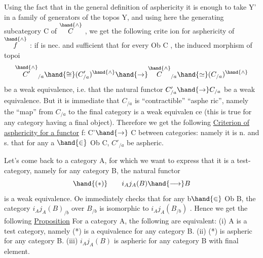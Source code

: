 Using the fact that in the  general definition of asphericity
it is enough to take Y' in a family of generators of the topos Y,  and 
using here the generating subcategory C of $\overset{\hand{\wedge}}{C}$ ,  we get the following crite
ion for asphericity of $\overset{\hand{\wedge}}{f}$ :  if is nec. and sufficient that for every
Ob C ,  the induced morphism of topoi
\[ \overset{\hand{\wedge}}{C'}_{/a} \hand{\cong} (C'_{/a})^{\hand{\wedge}} \hand{\to} \overset{\hand{\wedge}}{C}_{/a} \hand{\simeq} (C_{/a})^{\hand{\wedge}} \]
be a weak equivalence,  i.e. that the natural functor  $C'_{/a}\hand{\to} C_{/a}$ be a weak
equivalence.  But it is immediate that $C_{/a}$ is ``contractible''   ``asphe
ric'',  namely the ``map'' from $C_{/a}$ to the final category is a weak equivalen
ce (this is true for any category having a final object). Therefore we get
the following
\uline{Criterion of asphericity for a functor} f: C'$\hand{\to}$ C  between categories:
namely it is n. and s. that for any a $\hand{\in}$ Ob C,   $C'_{/a}$  be aspheric.

Let's come back to a  category A,  for which we want to express
that it is a test-category,  namely for any \inserted{[small]} category B,  the natural
functor
\[ \hand{(*)} \qquad i_Aj_A(B) \hand{\longrightarrow} B \]
is a weak equivalence.  Oe immediately checks that for any b$\hand{\in}$ Ob B,
the category  $i_Aj_A(B)_{/b}$  over $B_{/b}$  is isomorphic to $i_Aj_A(B_{/b})$ . Hence
we get the following
\uline{Proposition}  For a \inserted{[small]} category A,  the following are equivalent:
(i)  A is a test category,  namely (*) is a  equivalence for any \inserted{[small]}
category B.
(ii)  (*) is aspheric for any \inserted{[small]} category B.
(iii)  $i_Aj_A(B)$ is aspheric for any category B with final element.

